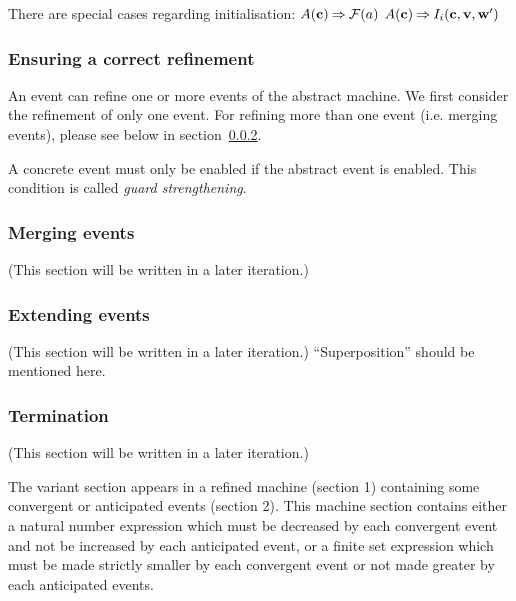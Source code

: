 There are special cases regarding initialisation:
  {$A(\mathbf{c}) \mathbin\Rightarrow  \mathcal{F}(a)$}
  {}%
  {$A(\mathbf{c}) \mathbin\Rightarrow I_i(\mathbf{c},{\mathbf{v},\mathbf{w}}')$}

\subsubsection{Ensuring a correct refinement}
\label{refinement_proof_obligations}
An event can refine one or more events of the abstract machine.
We first consider the refinement of only one event. 
For refining more than one event (i.e. merging events), please see below in section~\ref{merging_events}.


A concrete event must only be enabled if the abstract event is enabled.
This condition is called \emph{guard strengthening}.


\subsubsection{Merging events}
\label{merging_events}
(This section will be written in a later iteration.)

\subsubsection{Extending events}
\label{extending_events}
(This section will be written in a later iteration.)
``Superposition'' should be mentioned here.


\subsubsection{Termination}
\label{termination}
(This section will be written in a later iteration.)

The variant section appears in a refined machine (section 1) containing some convergent or anticipated events (section 2). This machine section contains either a natural number expression which must be decreased by each convergent event and not be increased by each anticipated event, or a finite set expression which must be made strictly smaller by each convergent event or not made greater by each anticipated events. 

